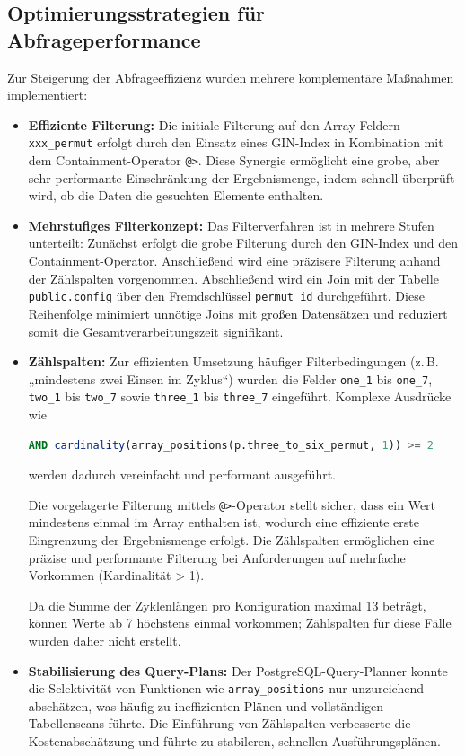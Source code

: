 \documentclass[12pt, ngerman, a4paper, numbers=noenddot]{article}
\begin{document}
\subsection{Optimierungsstrategien für Abfrageperformance}

Zur Steigerung der Abfrageeffizienz wurden mehrere komplementäre Maßnahmen implementiert:

\begin{itemize}
	\item \textbf{Effiziente Filterung:}  
	Die initiale Filterung auf den Array-Feldern \newline\lstinline|xxx_permut| erfolgt durch den Einsatz eines GIN-Index in Kombination mit dem Containment\hyp{}Operator \lstinline|@>|. Diese Synergie ermöglicht eine grobe, aber sehr performante Einschränkung der Ergebnismenge, indem schnell überprüft wird, ob die Daten die gesuchten Elemente enthalten. 
	
	\item \textbf{Mehrstufiges Filterkonzept:}  
	Das Filterverfahren ist in mehrere Stufen unterteilt: Zunächst erfolgt die grobe Filterung durch den GIN-Index und den Containment-Operator. Anschließend wird eine präzisere Filterung anhand der Zählspalten vorgenommen. Abschließend wird ein Join mit der Tabelle \lstinline|public.config| über den Fremdschlüssel \lstinline|permut_id| durchgeführt. Diese Reihenfolge minimiert unnötige Joins mit großen Datensätzen und reduziert somit die Gesamtverarbeitungszeit signifikant.
	
	\item \textbf{Zählspalten:}  
	Zur effizienten Umsetzung häufiger Filterbedingungen (z.\,B. „mindestens zwei Einsen im Zyklus“) wurden die Felder \lstinline|one_1| bis \lstinline|one_7|, \lstinline|two_1| bis \lstinline|two_7| sowie \lstinline|three_1| bis \lstinline|three_7| eingeführt. Komplexe Ausdrücke wie
	\begin{lstlisting}[language=SQL]
AND cardinality(array_positions(p.three_to_six_permut, 1)) >= 2
	\end{lstlisting}
	werden dadurch vereinfacht und performant ausgeführt.
	
	Die vorgelagerte Filterung mittels \lstinline|@>|-Operator stellt sicher, dass ein Wert mindestens einmal im Array enthalten ist, wodurch eine effiziente erste Eingrenzung der Ergebnismenge erfolgt. Die Zählspalten ermöglichen eine präzise und performante Filterung bei Anforderungen auf mehrfache Vorkommen (Kardinalität > 1).
	
	Da die Summe der Zyklenlängen pro Konfiguration maximal 13 beträgt, können Werte ab 7 höchstens einmal vorkommen; Zählspalten für diese Fälle wurden daher nicht erstellt.
	
	\item \textbf{Stabilisierung des Query-Plans:} Der PostgreSQL-Query-Planner konnte die Selektivität von Funktionen wie \lstinline|array_positions| nur unzureichend abschätzen, was häufig zu ineffizienten Plänen und vollständigen Tabellenscans führte. Die Einführung von Zählspalten verbesserte die Kostenabschätzung und führte zu stabileren, schnellen Ausführungsplänen.
\end{itemize}
\end{document}
